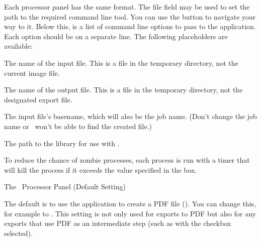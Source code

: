 Each processor panel has the same format. The file field may be used
to set the path to the required command line tool. You can use the
 button to navigate your way to it. Below this, is
a list of command line options to pass to the application. Each
option should be on a separate line. The following placeholders are
available:
\begin{deflist}

\begin{itemdesc}
The name of the input file. This is a file in the temporary
directory, not the current image file.
\end{itemdesc}


\begin{itemdesc}
The name of the output file. This is a file in the temporary
directory, not the designated export file.
\end{itemdesc}


\begin{itemdesc}
The input file's basename, which will also be the job name. (Don't change
the job name or \FlowframTk\ won't be able to find the created file.)
\end{itemdesc}


\begin{itemdesc}
The path to the  library for use with .
\end{itemdesc}

\end{deflist}


To reduce the chance of zombie processes, each process is run with a
timer that will kill the process if it exceeds the value specified
in the  box.


 {}
 {The \pdfLaTeX\ Processor Panel (Default Setting)}

The default is to use the  application to create a PDF
file (). You can change this, for example to .
This setting is not only used for exports to PDF but also for any
exports that use PDF as an intermediate step (such as
 with the  checkbox
selected).

